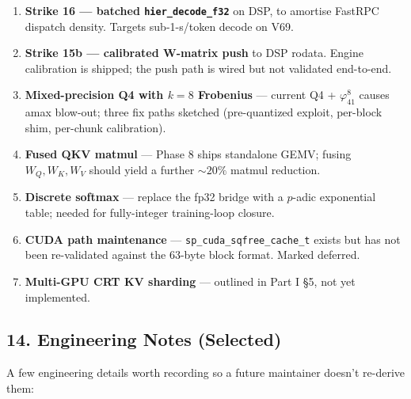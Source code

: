 \documentclass[
  11pt,
]{article}
\providecommand{\tightlist}{%
  \setlength{\itemsep}{0pt}\setlength{\parskip}{0pt}}
\begin{document}
\begin{enumerate}
\def\labelenumi{\arabic{enumi}.}
\tightlist
\item
  \textbf{Strike 16 --- batched \texttt{hier\_decode\_f32}} on DSP, to
  amortise FastRPC dispatch density. Targets sub-1-s/token decode on
  V69.
\item
  \textbf{Strike 15b --- calibrated W-matrix push} to DSP rodata. Engine
  calibration is shipped; the push path is wired but not validated
  end-to-end.
\item
  \textbf{Mixed-precision Q4 with \(k=8\) Frobenius} --- current Q4 +
  \(\varphi_{41}^8\) causes amax blow-out; three fix paths sketched
  (pre-quantized exploit, per-block shim, per-chunk calibration).
\item
  \textbf{Fused QKV matmul} --- Phase 8 ships standalone GEMV; fusing
  \(W_Q,W_K,W_V\) should yield a further \(\sim 20\%\) matmul reduction.
\item
  \textbf{Discrete softmax} --- replace the fp32 bridge with a
  \(p\)-adic exponential table; needed for fully-integer training-loop
  closure.
\item
  \textbf{CUDA path maintenance} --- \texttt{sp\_cuda\_sqfree\_cache\_t}
  exists but has not been re-validated against the 63-byte block format.
  Marked deferred.
\item
  \textbf{Multi-GPU CRT KV sharding} --- outlined in Part I §5, not yet
  implemented.
\end{enumerate}

\hypertarget{engineering-notes-selected}{%
\subsection{14. Engineering Notes
(Selected)}\label{engineering-notes-selected}}

A few engineering details worth recording so a future maintainer doesn't
re-derive them:
\end{document}
